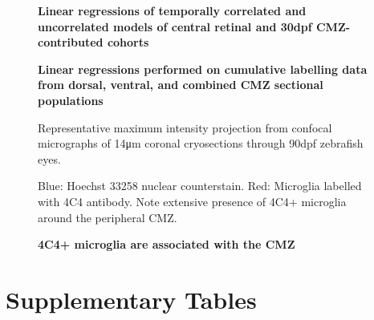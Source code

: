 \begin{figure}[!h]
    \caption{{\bf Linear regressions of temporally correlated and uncorrelated models of central retinal and 30dpf CMZ-contributed cohorts}}
    \label{a27linreg}
\end{figure}


\begin{figure}[!h]
    \caption{{\bf Linear regressions performed on cumulative labelling data from dorsal, ventral, and combined CMZ sectional populations}}
    \label{cumEdUlinreg}
\end{figure}

\begin{figure}[!h]
    \caption{{\bf 4C4+ microglia are associated with the CMZ}}
    Representative maximum intensity projection from confocal micrographs of 14\si{\micro\metre} coronal cryosections through 90dpf zebrafish eyes.
    
    Blue: Hoechst 33258 nuclear counterstain. Red: Microglia labelled with 4C4 antibody. Note extensive presence of 4C4+ microglia around the peripheral CMZ.
    \label{4C4micrograph}
\end{figure}

\FloatBarrier

\section{Supplementary Tables}
\FloatBarrier

